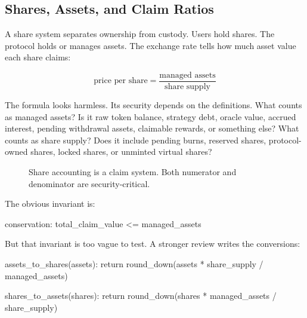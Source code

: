 \subsection{Shares, Assets, and Claim Ratios}

A share system separates ownership from custody. Users hold shares. The protocol holds or manages assets. The exchange rate tells how much asset value each share claims:

\[
\text{price per share} = \frac{\text{managed assets}}{\text{share supply}}
\]

The formula looks harmless. Its security depends on the definitions. What counts as managed assets? Is it raw token balance, strategy debt, oracle value, accrued interest, pending withdrawal assets, claimable rewards, or something else? What counts as share supply? Does it include pending burns, reserved shares, protocol-owned shares, locked shares, or unminted virtual shares?

\begin{figure}[htbp]
\centering
{}
\caption{Share accounting is a claim system. Both numerator and denominator are security-critical.}
\end{figure}

The obvious invariant is:

\begin{codeblock}
conservation:
    total_claim_value <= managed_assets
\end{codeblock}

But that invariant is too vague to test. A stronger review writes the conversions:

\begin{codeblock}
assets_to_shares(assets):
    return round_down(assets * share_supply / managed_assets)

shares_to_assets(shares):
    return round_down(shares * managed_assets / share_supply)
\end{codeblock}

